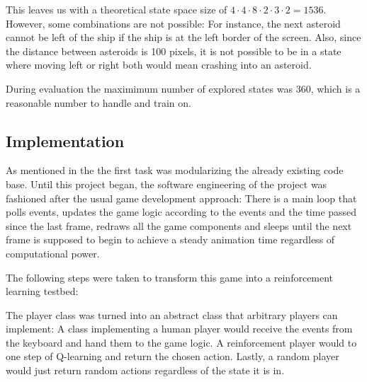 \documentclass[a4paper,10pt]{article}
\begin{document}

This leaves us with a theoretical state space size of $4 \cdot 4 \cdot 8 \cdot 2 \cdot 3 \cdot 2 = 1536$.
However, some combinations are not possible: For instance, the next asteroid cannot be left of the ship if the ship is at the left border of the screen.
Also, since the distance between asteroids is 100 pixels, it is not possible to be in a state where moving left or right both would mean crashing into an asteroid.

During evaluation the maximimum number of explored states was $360$, which is a reasonable number to handle and train on.



\subsection{Implementation}

As mentioned in the  the first task was modularizing the already existing code base.
Until this project began, the software engineering of the project was fashioned after the usual game development approach:
There is a main loop that polls events, updates the game logic according to the events and the time passed since the last frame, redraws all the game components and sleeps until the next frame is supposed to begin to achieve a steady animation time regardless of computational power.

The following steps were taken to transform this game into a reinforcement learning testbed:

The player class was turned into an abstract class that arbitrary players can implement: A class implementing a human player would receive the events from the keyboard and hand them to the game logic.
A reinforcement player would to one step of Q-learning and return the chosen action.
Lastly, a random player would just return random actions regardless of the state it is in.
\end{document}
